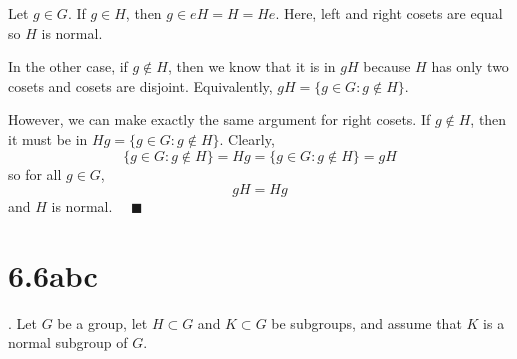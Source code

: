 \documentclass[12pt]{article}
\newcommand{\qed}{\quad \blacksquare}
\begin{document}
    \color{blue}
        Let $g \in G$. If $g \in H$, then $g \in eH = H = He$. Here, left and right cosets are equal so $H$ is normal.
        
        In the other case, if $g \not \in H$, then we know that it is in $gH$ because $H$ has only two cosets and cosets are disjoint. Equivalently, $gH = \{g \in G: g \not \in H\}$. 

        However, we can make exactly the same argument for right cosets. If $g \not \in H$, then it must be in $Hg = \{g \in G: g \not \in H\}$. Clearly, 
        \[\{g \in G: g \not \in H\} = Hg = \{g \in G: g \not \in H\} = gH\]
        so for all $g \in G$, 
        \[gH = Hg\]
        and $H$ is normal. $\qed$

    \color{black}
\pagebreak

\section*{6.6abc}. 
Let $G$ be a group, let $H \subset G$ and $K \subset G$ be subgroups, and assume that
$K$ is a normal subgroup of $G$.
\end{document}
